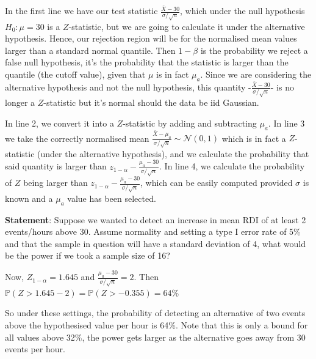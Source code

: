 \documentclass{homework}
\begin{document}
In the first line we have our test statistic $\frac{\bar{X}-30}{\sigma/\sqrt{n}}$, which under the null hypothesis $H_0 : \mu = 30$ is a $Z$-statistic, but we are going to calculate it under the alternative hypothesis. Hence, our rejection region will be for the normalised mean values larger than a standard normal quantile. Then $1-\beta$ is the probability we reject a false null hypothesis, it's the probability that the statistic is larger than the quantile (the cutoff value), given that $\mu$ is in fact $\mu_a$. 
Since we are considering the alternative hypothesis and not the null hypothesis, this quantity -$\frac{\bar{X}-30}{\sigma/\sqrt{n}}$- is no longer a $Z$-statistic but it's normal should the data be iid Gaussian. 

In line 2, we convert it into a $Z$-statistic by adding and subtracting $\mu_a$. In line 3 we take the correctly normalised mean $\frac{\bar{X}-\mu_a}{\sigma/\sqrt{n}} \sim \mathcal{N}(0, 1)$ which is in fact a $Z$-statistic (under the alternative hypothesis), and we calculate the probability that said quantity is larger than $z_{1-\alpha}-\frac{\mu_a-30}{\sigma/\sqrt{n}}$. 
In line 4, we calculate the probability of $Z$ being larger than $z_{1-\alpha}-\frac{\mu_a-30}{\sigma/\sqrt{n}}$, which can be easily computed provided $\sigma$ is known and a $\mu_a$ value has been selected. \\

\begin{tcolorbox}[title=Example]

\textbf{Statement}: Suppose we wanted to detect an increase in mean RDI of at least 2 events/hours above 30. Assume normality and setting a type I error rate of 5\% and that the sample in question will have a standard deviation of 4, what would be the power if we took a sample size of 16?

Now, $Z_{1-\alpha} = 1.645$ and $\frac{\mu_a-30}{\sigma/\sqrt{n}} = 2$. Then $\mathds{P}(Z > 1.645 - 2)  = \mathds{P}(Z > -0.355) = 64\%$

So under these settings, the probability of detecting an alternative of two events above the hypothesised value per hour is 64\%. Note that this is only a bound for all values above 32\%, the power gets larger as the alternative goes away from 30 events per hour.

\end{tcolorbox}
\end{document}
